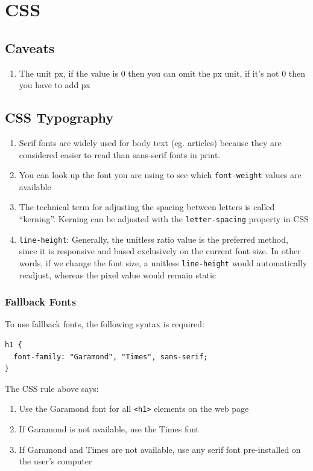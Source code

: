\documentclass[a4paper, 12pt]{article}
\begin{document}
\section{CSS}

\subsection{Caveats}
\begin{enumerate}
\item The unit px, if the value is 0 then you can omit the px unit, if it's not 0 then you have to add px

\end{enumerate}


\subsection{CSS Typography}
\begin{enumerate}

\item Serif fonts are widely used for body text (eg. articles) because they are considered easier to read than sans-serif fonts in print.

\item You can look up the font you are using to see which \verb|font-weight| values are available

\item The technical term for adjusting the spacing between letters is called ``kerning''. Kerning can be adjusted with the \verb|letter-spacing| property in CSS

\item \verb|line-height|: Generally, the unitless ratio value is the preferred method, since it is responsive and based exclusively on the current font size. In other words, if we change the font size, a unitless \verb|line-height| would automatically readjust, whereas the pixel value would remain static

\end{enumerate}

\subsubsection{Fallback Fonts}
To use fallback fonts, the following syntax is required:
\begin{verbatim}
h1 {
  font-family: "Garamond", "Times", sans-serif;
}
\end{verbatim}
The CSS rule above says:
\begin{enumerate}
\item Use the Garamond font for all \verb|<h1>| elements on the web page

\item If Garamond is not available, use the Times font

\item If Garamond and Times are not available, use any serif font pre-installed on the user's computer

\end{enumerate}
\end{document}

